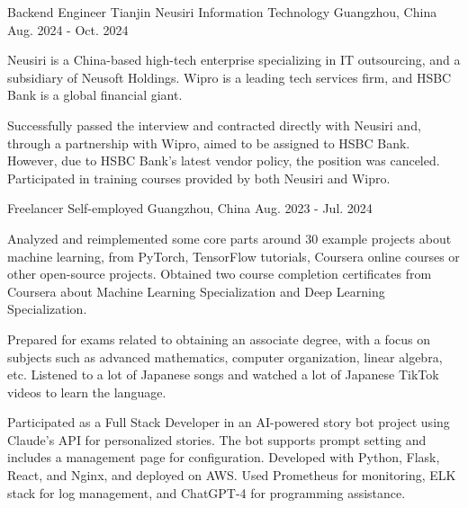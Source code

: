 
\begin{cventries}

  \cventry
    {Backend Engineer} %
    {Tianjin Neusiri Information Technology} %
    {Guangzhou, China} %
    {Aug. 2024 - Oct. 2024} %
    {
      \begin{cvitems} %
        \item {Neusiri is a China-based high-tech enterprise specializing in IT outsourcing, and a subsidiary of Neusoft Holdings. Wipro is a leading tech services firm, and HSBC Bank is a global financial giant.}
        \item {Successfully passed the interview and contracted directly with Neusiri and, through a partnership with Wipro, aimed to be assigned to HSBC Bank. However, due to HSBC Bank's latest vendor policy, the position was canceled. Participated in training courses provided by both Neusiri and Wipro.}
      \end{cvitems}
    }

  \cventry
    {Freelancer} %
    {Self-employed} %
    {Guangzhou, China} %
    {Aug. 2023 - Jul. 2024} %
    {
      \begin{cvitems} %
        \item {Analyzed and reimplemented some core parts around 30 example projects about machine learning, from PyTorch, TensorFlow tutorials, Coursera online courses or other open-source projects. Obtained two course completion certificates from Coursera about Machine Learning Specialization and Deep Learning Specialization.}
        \item {Prepared for exams related to obtaining an associate degree, with a focus on subjects such as advanced mathematics, computer organization, linear algebra, etc. Listened to a lot of Japanese songs and watched a lot of Japanese TikTok videos to learn the language.}
        \item {Participated as a Full Stack Developer in an AI-powered story bot project using Claude's API for personalized stories. The bot supports prompt setting and includes a management page for configuration. Developed with Python, Flask, React, and Nginx, and deployed on AWS. Used Prometheus for monitoring, ELK stack for log management, and ChatGPT-4 for programming assistance.}
      \end{cvitems}
    }


\end{cventries}
